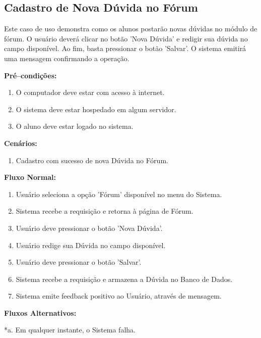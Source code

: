 \documentclass[graduacao,brazil]{ThesisPUC}
\begin{document}
\subsection{Cadastro de Nova D\'{u}vida no F\'{o}rum}

Este caso de uso demonstra como os alunos postar\~{a}o novas d\'{u}vidas no m\'{o}dulo de f\'{o}rum.
O usu\'{a}rio dever\'{a} clicar no bot\~{a}o 'Nova D\'{u}vida' e redigir sua d\'{u}vida no campo dispon\'{i}vel.
Ao fim, basta pressionar o bot\~{a}o 'Salvar'. O sistema emitir\'{a} uma mensagem confirmando a opera\c{c}\~{a}o. 

\textbf{Pr\'{e}--condi\c{c}\~{o}es:}

\begin{enumerate}
  \item O computador deve estar com acesso \`{a} internet.
  \item O sistema deve estar hospedado em algum servidor.
  \item O aluno deve estar logado no sistema.
\end{enumerate}

\textbf{Cen\'{a}rios:}

\begin{enumerate}
  \item Cadastro com sucesso de nova D\'{u}vida no F\'{o}rum.
\end{enumerate}

\textbf{Fluxo Normal:}

\begin{enumerate}
  \item Usu\'{a}rio seleciona a op\c{c}\~{a}o 'F\'{o}rum' dispon\'{i}vel no menu do Sistema.
  \item Sistema recebe a requisi\c{c}\~{a}o e retorna \`{a} p\'{a}gina de F\'{o}rum.
  \item Usu\'{a}rio deve pressionar o bot\~{a}o 'Nova D\'{u}vida'.
  \item Usu\'{a}rio redige sua D\'{u}vida no campo dispon\'{i}vel.
  \item Usu\'{a}rio deve pressionar o bot\~{a}o 'Salvar'.
  \item Sistema recebe a requisi\c{c}\~{a}o e armazena a D\'{u}vida no Banco de Dados.
  \item Sistema emite feedback positivo ao Usu\'{a}rio, atrav\'{e}s de mensagem.
\end{enumerate}


\textbf{Fluxos Alternativos:}

*a. Em qualquer instante, o Sistema falha.
\end{document}
